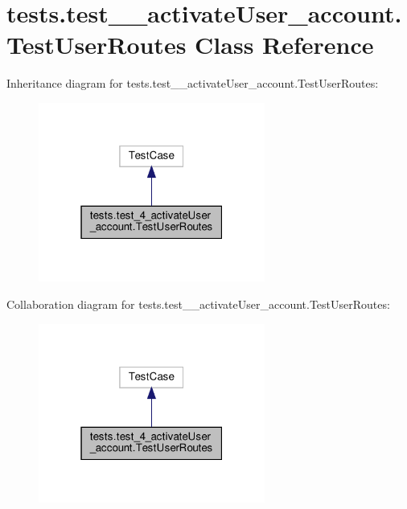 \hypertarget{classtests_1_1test__4__activate_user__account_1_1_test_user_routes}{}\section{tests.\+test\+\_\+\_\+activate\+User\+\_\+account.\+Test\+User\+Routes Class Reference}
\label{classtests_1_1test__4__activate_user__account_1_1_test_user_routes}


Inheritance diagram for tests.\+test\+\_\+\_\+activate\+User\+\_\+account.\+Test\+User\+Routes\+:
\nopagebreak
\begin{figure}[H]
\begin{center}
\leavevmode
\includegraphics[width=211pt]{classtests_1_1test__4__activate_user__account_1_1_test_user_routes__inherit__graph}
\end{center}
\end{figure}


Collaboration diagram for tests.\+test\+\_\+\_\+activate\+User\+\_\+account.\+Test\+User\+Routes\+:
\nopagebreak
\begin{figure}[H]
\begin{center}
\leavevmode
\includegraphics[width=211pt]{classtests_1_1test__4__activate_user__account_1_1_test_user_routes__coll__graph}
\end{center}
\end{figure}
